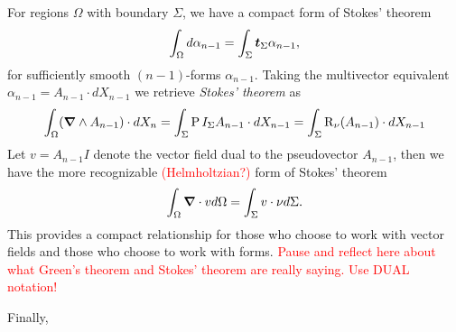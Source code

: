 For regions $\Omega$ with boundary $\Sigma$, we have a compact form of Stokes' theorem
\[
\int_\Omega d \alpha_{n-1} = \int_\Sigma \boldsymbol{t}_\Sigma \alpha_{n-1},
\]
for sufficiently smooth $(n-1)$-forms $\alpha_{n-1}$. Taking the multivector equivalent $\alpha_{n-1} = A_{n-1} \cdot dX_{n-1}$ we retrieve \emph{Stokes' theorem} as
\[
\int_\Omega (\boldsymbol{\nabla} \wedge A_{n-1}) \cdot dX_n = \int_\Sigma \operatorname{P}{I_\Sigma}{A_{n-1}} \cdot dX_{n-1}  = \int_\Sigma \operatorname{R}_{\nu}(A_{n-1}) \cdot dX_{n-1}
\]
Let $v = A_{n-1} I$ denote the vector field dual to the pseudovector $A_{n-1}$, then we have the more recognizable \textcolor{red}{(Helmholtzian?)} form of Stokes' theorem
\[
\int_\Omega \boldsymbol{\nabla} \cdot v d\Omega = \int_\Sigma v \cdot \nu d\Sigma.
\]
 This provides a compact relationship for those who choose to work with vector fields and those who choose to work with forms. \textcolor{red}{Pause and reflect here about what Green's theorem and Stokes' theorem are really saying. Use DUAL notation!}

Finally,





